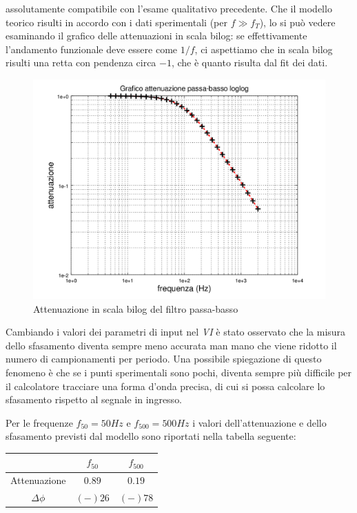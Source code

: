 \documentclass[journal, a4paper]{IEEEtran}
\begin{document}
assolutamente compatibile con l'esame qualitativo precedente. Che il modello teorico risulti in accordo con i dati sperimentali (per $f \gg f_T$), lo si può vedere esaminando il grafico delle attenuazioni in scala bilog: se effettivamente l'andamento funzionale deve essere come $1/f$, ci aspettiamo che in scala bilog risulti una retta con pendenza circa $-1$, che è quanto risulta dal fit dei dati.

\begin{figure}
\centering
\includegraphics[width=1.1\linewidth]{./attenuaz_passa_basso_loglog}
\caption{Attenuazione in scala bilog del filtro passa-basso}
\label{fig:attenuaz_passa_basso_loglog}
\end{figure}



Cambiando i valori dei parametri di input nel \textit{VI} è stato osservato che la misura dello sfasamento diventa sempre meno accurata man mano che viene ridotto il numero di campionamenti per periodo. Una possibile spiegazione di questo fenomeno è che se i punti sperimentali sono pochi, diventa sempre più difficile per il calcolatore tracciare una forma d'onda precisa, di cui si possa calcolare lo sfasamento rispetto al segnale in ingresso.

Per le frequenze $f_{50} = 50 Hz$ e $f_{500} = 500 Hz$ i valori dell'attenuazione e dello sfasamento previsti dal modello sono riportati nella tabella seguente:\\

\begin{tabular}{|c|c|c|}
\hline  & $f_{50}$ & $f_{500}$ \\ 
\hline Attenuazione & $0.89$ & $0.19$ \\ 
\hline $\Delta \phi $& $(-)26$  & $(-)78$ \\ 
\hline 
\end{tabular} \\
\end{document}
